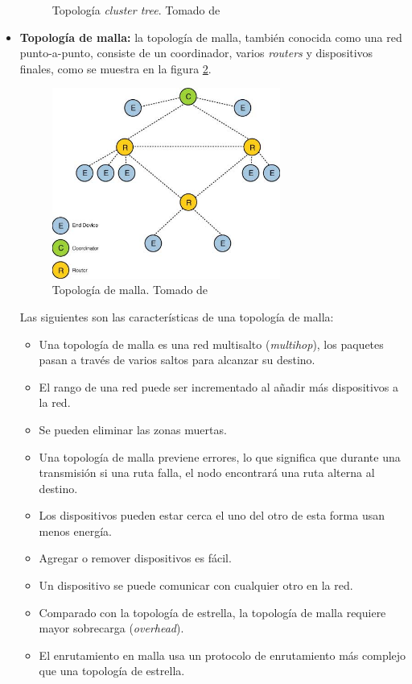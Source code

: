 \documentclass[10pt,journal,compsoc]{IEEEtran}
\begin{document}
\begin{itemize}
\begin{figure}[h]
        \caption{Topología \emph{cluster tree}. Tomado de \cite{gshewender}}
        \label{fig:cluster-tree-topology}
    \end{figure}
    \item \textbf{Topología de malla:}  la topología de malla, también conocida como una red punto-a-punto, consiste de un coordinador, varios \emph{routers} y dispositivos finales, como se muestra en la figura \ref{fig:mesh-topology}.
    \begin{figure}[h]
        \centering
        \includegraphics[width=7.5cm]{mesh-topology}
        \caption{Topología de malla. Tomado de \cite{gshewender}}
        \label{fig:mesh-topology}
    \end{figure}
    Las siguientes son las características de una topología de malla:
    \begin{itemize}
        \item Una topología de malla es una red multisalto (\emph{multihop}), los paquetes pasan a través de varios saltos para alcanzar su destino.
        \item El rango de una red puede ser incrementado al añadir más dispositivos a la red.
        \item Se pueden eliminar las zonas muertas.
        \item Una topología de malla previene errores, lo que significa que durante una transmisión si una ruta falla, el nodo encontrará una ruta alterna al destino. 
        \item Los dispositivos pueden estar cerca el uno del otro de esta forma usan menos energía.
        \item Agregar o remover dispositivos es fácil.
        \item Un dispositivo se puede comunicar con cualquier otro en la red.
        \item Comparado con la topología de estrella, la topología de malla requiere mayor sobrecarga (\emph{overhead}).
        \item El enrutamiento en malla usa un protocolo de enrutamiento más complejo que una topología de estrella.
    \end{itemize}    
\end{itemize}
\end{document}
